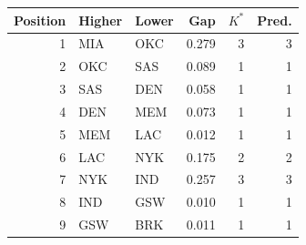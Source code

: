 \begin{tabular}{rllrrr}
\toprule
Position & Higher & Lower & Gap & $K^*$ & Pred. \\
\midrule
1 & MIA & OKC & 0.279 & 3 & 3 \\
2 & OKC & SAS & 0.089 & 1 & 1 \\
3 & SAS & DEN & 0.058 & 1 & 1 \\
4 & DEN & MEM & 0.073 & 1 & 1 \\
5 & MEM & LAC & 0.012 & 1 & 1 \\
6 & LAC & NYK & 0.175 & 2 & 2 \\
7 & NYK & IND & 0.257 & 3 & 3 \\
8 & IND & GSW & 0.010 & 1 & 1 \\
9 & GSW & BRK & 0.011 & 1 & 1 \\
\bottomrule
\end{tabular}
